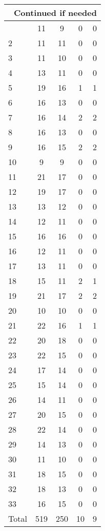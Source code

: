 \begin{center}
\begin{longtable}{l|c|c|c|c}
\hline \multicolumn{5}{|r|}{{Continued if needed}} \\ \hline
\endfoot 
1 & 11 & 9 & 0 & 0\\ \hline
2 & 11 & 11 & 0 & 0\\ \hline
3 & 11 & 10 & 0 & 0\\ \hline
4 & 13 & 11 & 0 & 0\\ \hline
5 & 19 & 16 & 1 & 1\\ \hline
6 & 16 & 13 & 0 & 0\\ \hline
7 & 16 & 14 & 2 & 2\\ \hline
8 & 16 & 13 & 0 & 0\\ \hline
9 & 16 & 15 & 2 & 2\\ \hline
10 & 9 & 9 & 0 & 0\\ \hline
11 & 21 & 17 & 0 & 0\\ \hline
12 & 19 & 17 & 0 & 0\\ \hline
13 & 13 & 12 & 0 & 0\\ \hline
14 & 12 & 11 & 0 & 0\\ \hline
15 & 16 & 16 & 0 & 0\\ \hline
16 & 12 & 11 & 0 & 0\\ \hline
17 & 13 & 11 & 0 & 0\\ \hline
18 & 15 & 11 & 2 & 1\\ \hline
19 & 21 & 17 & 2 & 2\\ \hline
20 & 10 & 10 & 0 & 0\\ \hline
21 & 22 & 16 & 1 & 1\\ \hline
22 & 20 & 18 & 0 & 0\\ \hline
23 & 22 & 15 & 0 & 0\\ \hline
24 & 17 & 14 & 0 & 0\\ \hline
25 & 15 & 14 & 0 & 0\\ \hline
26 & 14 & 11 & 0 & 0\\ \hline
27 & 20 & 15 & 0 & 0\\ \hline
28 & 22 & 14 & 0 & 0\\ \hline
29 & 14 & 13 & 0 & 0\\ \hline
30 & 11 & 10 & 0 & 0\\ \hline
31 & 18 & 15 & 0 & 0\\ \hline
32 & 18 & 13 & 0 & 0\\ \hline
33 & 16 & 15 & 0 & 0\\ \hline
\hline \hline
Total & 519 & 250 & 10 & 9




\end{longtable}
\end{center}

